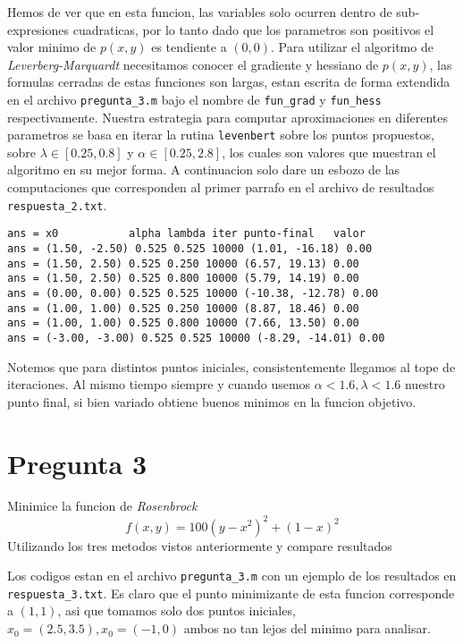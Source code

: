 \documentclass[letterpaper]{article}
\begin{document}
Hemos de ver que en esta funcion, las variables solo ocurren dentro de
sub-expresiones cuadraticas, por lo tanto dado que los parametros son
positivos el valor minimo de \(p(x,y)\) es tendiente a \((0,0)\). Para
utilizar el algoritmo de \emph{Leverberg-Marquardt} necesitamos conocer
el gradiente y hessiano de \(p(x,y)\), las formulas cerradas de estas
funciones son largas, estan escrita de forma extendida en el archivo
\texttt{pregunta\_3.m} bajo el nombre de \texttt{fun\_grad} y
\texttt{fun\_hess} respectivamente. Nuestra estrategia para computar
aproximaciones en diferentes parametros se basa en iterar la rutina
\texttt{levenbert} sobre los puntos propuestos, sobre \(\lambda \in
[0.25, 0.8]\) y \(\alpha \in [0.25, 2.8]\), los cuales son valores que
muestran el algoritmo en su mejor forma. A continuacion solo dare un
esbozo de las computaciones que corresponden al primer parrafo en el
archivo de resultados \texttt{respuesta\_2.txt}.
\begin{verbatim}
ans = x0           alpha lambda iter punto-final   valor
ans = (1.50, -2.50) 0.525 0.525 10000 (1.01, -16.18) 0.00
ans = (1.50, 2.50) 0.525 0.250 10000 (6.57, 19.13) 0.00
ans = (1.50, 2.50) 0.525 0.800 10000 (5.79, 14.19) 0.00
ans = (0.00, 0.00) 0.525 0.525 10000 (-10.38, -12.78) 0.00
ans = (1.00, 1.00) 0.525 0.250 10000 (8.87, 18.46) 0.00
ans = (1.00, 1.00) 0.525 0.800 10000 (7.66, 13.50) 0.00
ans = (-3.00, -3.00) 0.525 0.525 10000 (-8.29, -14.01) 0.00
\end{verbatim}
Notemos que para distintos puntos iniciales, consistentemente llegamos al
tope de iteraciones. Al mismo tiempo siempre y cuando usemos \(\alpha < 1.6,
\lambda < 1.6\) nuestro punto final, si bien variado obtiene buenos minimos en la funcion objetivo.

\section*{Pregunta 3}
\noindent Minimice la funcion de \emph{Rosenbrock}
\[ f(x,y) = 100 (y - x^2)^2 + (1 - x)^2 \]
Utilizando los tres metodos vistos anteriormente y compare resultados
\newline

Los codigos estan en el archivo \texttt{pregunta\_3.m} con un ejemplo de
los resultados en \texttt{respuesta\_3.txt}. Es claro que el punto
minimizante de esta funcion corresponde a \((1,1)\), asi que tomamos solo
dos puntos iniciales, \(x_0 = (2.5, 3.5), x_0 = (-1,0) \) ambos no tan
lejos del minimo para analisar.
\end{document}
